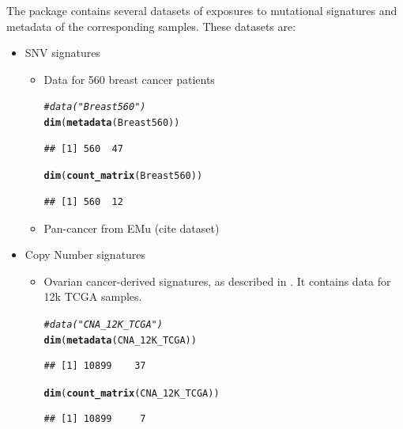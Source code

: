 \documentclass{article}\usepackage[]{graphicx}\usepackage[]{color}
\makeatletter
\newcommand{\hlcom}[1]{\textcolor[rgb]{0.678,0.584,0.686}{\textit{#1}}}%
\newcommand{\hlstd}[1]{\textcolor[rgb]{0.345,0.345,0.345}{#1}}%
\newcommand{\hlkwd}[1]{\textcolor[rgb]{0.737,0.353,0.396}{\textbf{#1}}}%
\newenvironment{kframe}{%
 \def\at@end@of@kframe{}%
 \ifinner\ifhmode%
  \def\at@end@of@kframe{\end{minipage}}%
  \begin{minipage}{\columnwidth}%
 \fi\fi%
 \def\FrameCommand##1{\hskip\@totalleftmargin \hskip-\fboxsep
 \colorbox{shadecolor}{##1}\hskip-\fboxsep
     \hskip-\linewidth \hskip-\@totalleftmargin \hskip\columnwidth}%
 \MakeFramed {\advance\hsize-\width
   \@totalleftmargin\z@ \linewidth\hsize
   \@setminipage}}%
 {\par\unskip\endMakeFramed%
 \at@end@of@kframe}
\newenvironment{knitrout}{}{} %
\makeatother
\begin{document}
The package contains several datasets of exposures to mutational signatures and metadata of the corresponding samples. These datasets are:
\begin{itemize}
\item SNV signatures
\begin{itemize}
\item Data for 560 breast cancer patients

\begin{knitrout}
\color{fgcolor}\begin{kframe}
\begin{alltt}
\hlcom{# data("Breast560")}
\hlkwd{dim}\hlstd{(}\hlkwd{metadata}\hlstd{(Breast560))}
\end{alltt}
\begin{verbatim}
## [1] 560  47
\end{verbatim}
\begin{alltt}
\hlkwd{dim}\hlstd{(}\hlkwd{count_matrix}\hlstd{(Breast560))}
\end{alltt}
\begin{verbatim}
## [1] 560  12
\end{verbatim}
\end{kframe}
\end{knitrout}

\item Pan-cancer from EMu\cite{fischer2013emu} (cite dataset)
\end{itemize}
\item Copy Number signatures
\begin{itemize}
\item Ovarian cancer-derived signatures, as described in \cite{macintyre2018copy}. It contains data for 12k TCGA samples.

\begin{knitrout}
\color{fgcolor}\begin{kframe}
\begin{alltt}
\hlcom{#data("CNA_12K_TCGA")}
\hlkwd{dim}\hlstd{(}\hlkwd{metadata}\hlstd{(CNA_12K_TCGA))}
\end{alltt}
\begin{verbatim}
## [1] 10899    37
\end{verbatim}
\begin{alltt}
\hlkwd{dim}\hlstd{(}\hlkwd{count_matrix}\hlstd{(CNA_12K_TCGA))}
\end{alltt}
\begin{verbatim}
## [1] 10899     7
\end{verbatim}
\end{kframe}
\end{knitrout}


\end{itemize}
\end{itemize}
\end{document}
